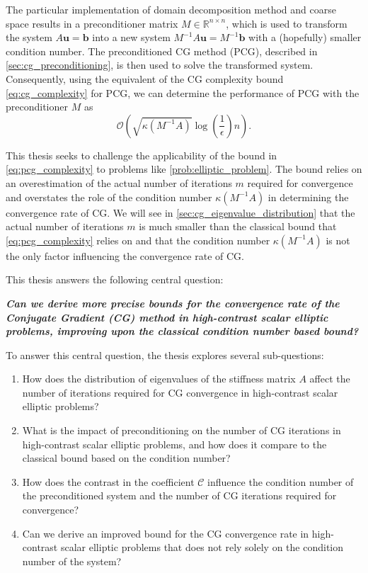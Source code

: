 The particular implementation of domain decomposition method and coarse space results in a preconditioner matrix $M\in\mathbb{R}^{n \times n}$, which is used to transform the system $A\mathbf{u} = \mathbf{b}$ into a new system $M^{-1}A\mathbf{u} = M^{-1}\mathbf{b}$ with a (hopefully) smaller condition number. The preconditioned CG method (PCG), described in \cref{sec:cg_preconditioning}, is then used to solve the transformed system. Consequently, using the equivalent of the CG complexity bound \cref{eq:cg_complexity} for PCG, we can determine the performance of PCG with the preconditioner $M$ as
\begin{equation}
  \mathcal{O}\left(\sqrt{\kappa(M^{-1}A)}\log\left(\frac{1}{\epsilon}\right)n\right).
  \label{eq:pcg_complexity}
\end{equation}

This thesis seeks to challenge the applicability of the bound in \cref{eq:pcg_complexity} to problems like \cref{prob:elliptic_problem}. The bound relies on an overestimation of the actual number of iterations $m$ required for convergence and overstates the role of the condition number $\kappa(M^{-1}A)$ in determining the convergence rate of CG. We will see in \cref{sec:cg_eigenvalue_distribution} that the actual number of iterations $m$ is much smaller than the classical bound that \cref{eq:pcg_complexity} relies on and that the condition number $\kappa(M^{-1}A)$ is not the only factor influencing the convergence rate of CG. 

This thesis answers the following central question:
\vspace{0.5em}
\begin{center}
\textit{\textbf{Can we derive more precise bounds for the convergence rate of the Conjugate Gradient (CG) method in high-contrast scalar elliptic problems, improving upon the classical condition number based bound?}}
\end{center}
\vspace{0.5em}

To answer this central question, the thesis explores several sub-questions:
\begin{enumerate}
    \item How does the distribution of eigenvalues of the stiffness matrix $A$ affect the number of iterations required for CG convergence in high-contrast scalar elliptic problems?
    \item What is the impact of preconditioning on the number of CG iterations in high-contrast scalar elliptic problems, and how does it compare to the classical bound based on the condition number?
    \item How does the contrast in the coefficient $\mathcal{C}$ influence the condition number of the preconditioned system and the number of CG iterations required for convergence?
    \item Can we derive an improved bound for the CG convergence rate in high-contrast scalar elliptic problems that does not rely solely on the condition number of the system?
\end{enumerate}

